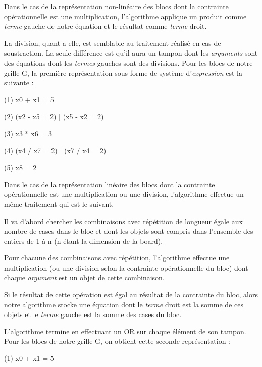 \documentclass[1]{report}
\begin{document}
\begin{itemize}
        Dans le cas de la représentation non-linéaire des blocs dont la contrainte opérationnelle est une multiplication, l'algorithme applique un produit comme \textit{terme} gauche de notre équation et le résultat comme \textit{terme} droit. 
        
        La division, quant a elle, est semblable au traitement réalisé en cas de soustraction. La seule différence est qu'il aura un tampon dont les \textit{arguments} sont des équations dont les \textit{termes} gauches sont des divisions. Pour les blocs de notre grille G, la première représentation sous forme de système d'\textit{expression} est la suivante : \newline

        (1) x0 + x1 = 5
        
        (2) (x2 - x5 = 2) | (x5 - x2 = 2)
        
        (3) x3 * x6 = 3
        
        (4) (x4 / x7 = 2) | (x7 / x4 = 2)
        
        (5) x8 = 2 \newline

        Dans le cas de la représentation linéaire des blocs dont la contrainte opérationnelle est une multiplication ou une division, l'algorithme effectue un même traitement qui est le suivant. 
        
        Il va d'abord chercher les combinaisons avec répétition de longueur égale aux nombre de cases dans le bloc et dont les objets sont compris dans l'ensemble des entiers de 1 à n (n étant la dimension de la
        board). 
        
        Pour chacune des combinaisons avec répétition, l'algorithme effectue une multiplication (ou une division selon la contrainte opérationnelle du bloc) dont chaque \textit{argument} est un objet de cette
        combinaison. 
        
        Si le résultat de cette opération est égal au résultat de la contrainte du bloc, alors notre algorithme stocke une équation dont le \textit{terme} droit est la somme de ces objets et le \textit{terme} gauche est la somme des cases du bloc. \newline
        
        L'algorithme termine en effectuant un OR sur chaque élément de son tampon. Pour les blocs de notre grille G, on obtient cette seconde représentation : \newline

        (1) x0 + x1 = 5
        

\end{itemize}
\end{document}
